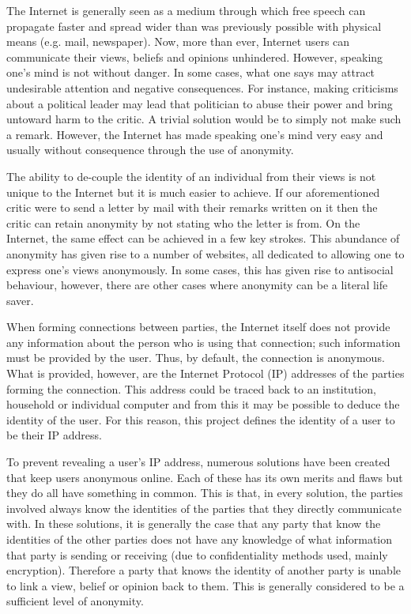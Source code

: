 \documentclass[ %
                    author={Luke Murray},
                supervisor={Dr. Simon Hollis},
                     title={Shadow Peer-to-Peer Networks},
                  subtitle={},
                    degree={MEng},
                      year={2013} ]{thesis}
\begin{document}

The Internet is generally seen as a medium through which free speech can propagate faster and spread wider than was previously possible with physical means (e.g. mail, newspaper). Now, more than ever, Internet users can communicate their views, beliefs and opinions unhindered. However, speaking one's mind is not without danger. In some cases, what one says may attract undesirable attention and negative consequences. For instance, making criticisms about a political leader may lead that politician to abuse their power and bring untoward harm to the critic. A trivial solution would be to simply not make such a remark. However, the Internet has made speaking one's mind very easy and usually without consequence through the use of anonymity.

The ability to de-couple the identity of an individual from their views is not unique to the Internet but it is much easier to achieve. If our aforementioned critic were to send a letter by mail with their remarks written on it then the critic can retain anonymity by not stating who the letter is from. On the Internet, the same effect can be achieved in a few key strokes. This abundance of anonymity has given rise to a number of websites, all dedicated to allowing one to express one's views anonymously. In some cases, this has given rise to antisocial behaviour, however, there are other cases where anonymity can be a literal life saver.

When forming connections between parties, the Internet itself does not provide any information about the person who is using that connection; such information must be provided by the user. Thus, by default, the connection is anonymous. What is provided, however, are the Internet Protocol (IP) addresses of the parties forming the connection. This address could be traced back to an institution, household or individual computer and from this it may be possible to deduce the identity of the user. For this reason, this project defines the identity of a user to be their IP address.

To prevent revealing a user's IP address, numerous solutions have been created that keep users anonymous online. Each of these has its own merits and flaws but they do all have something in common. This is that, in every solution, the parties involved always know the identities of the parties that they directly communicate with. In these solutions, it is generally the case that any party that know the identities of the other parties does not have any knowledge of what information that party is sending or receiving (due to confidentiality methods used, mainly encryption). Therefore a party that knows the identity of another party is unable to link a view, belief or opinion back to them. This is generally considered to be a sufficient level of anonymity.
\end{document}
